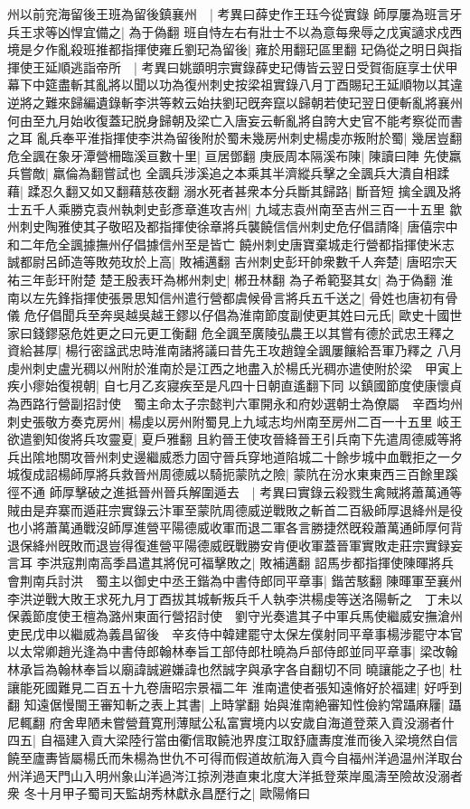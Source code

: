 州以前兖海留後王班為留後鎮襄州　|{
	考異曰薛史作王珏今從實錄}
師厚屢為班言牙兵王求等凶悍宜備之|{
	為于偽翻}
班自恃左右有壯士不以為意每衆辱之戊寅讁求戍西境是夕作亂殺班推都指揮使雍丘劉玘為留後|{
	雍於用翻玘區里翻}
玘偽從之明日與指揮使王延順逃詣帝所　|{
	考異曰姚顗明宗實錄薛史玘傳皆云翌日受賀衙庭享士伏甲幕下中筵盡斬其亂將以聞以功為復州刺史按梁祖實錄八月丁酉賜玘王延順物以其違逆將之難來歸編遺錄斬李洪等敕云始扶劉玘旣奔竄以歸朝若使玘翌日便斬亂將襄州何由至九月始收復蓋玘脱身歸朝及梁亡入唐妄云斬亂將自誇大史官不能考察從而書之耳}
亂兵奉平淮指揮使李洪為留後附於蜀未幾房州刺史楊虔亦叛附於蜀|{
	幾居豈翻}
危全諷在象牙潭營柵臨溪亘數十里|{
	亘居鄧翻}
庚辰周本隔溪布陳|{
	陳讀曰陣}
先使羸兵嘗敵|{
	羸倫為翻嘗試也}
全諷兵涉溪追之本乘其半濟縱兵擊之全諷兵大潰自相蹂藉|{
	蹂忍久翻又如又翻藉慈夜翻}
溺水死者甚衆本分兵斷其歸路|{
	斷音短}
擒全諷及將士五千人乘勝克袁州執刺史彭彥章進攻吉州|{
	九域志袁州南至吉州三百一十五里}
歙州刺史陶雅使其子敬昭及都指揮使徐章將兵襲饒信信州刺史危仔倡請降|{
	唐僖宗中和二年危全諷據撫州仔倡據信州至是皆亡}
饒州刺史唐寶棄城走行營都指揮使米志誠都尉呂師造等敗苑玫於上高|{
	敗補邁翻}
吉州刺史彭玕帥衆數千人奔楚|{
	唐昭宗天祐三年彭玕附楚}
楚王殷表玕為郴州刺史|{
	郴丑林翻}
為子希範娶其女|{
	為于偽翻}
淮南以左先鋒指揮使張景思知信州遣行營都虞候骨言將兵五千送之|{
	骨姓也唐初有骨儀}
危仔倡聞兵至奔吳越吳越王鏐以仔倡為淮南節度副使更其姓曰元氏|{
	歐史十國世家曰錢鏐惡危姓更之曰元更工衡翻}
危全諷至廣陵弘農王以其嘗有德於武忠王釋之資給甚厚|{
	楊行密諡武忠時淮南諸將議曰昔先王攻趙鍠全諷屢饟給吾軍乃釋之}
八月虔州刺史盧光稠以州附於淮南於是江西之地盡入於楊氏光稠亦遣使附於梁　甲寅上疾小瘳始復視朝|{
	自七月乙亥寢疾至是凡四十日朝直遙翻下同}
以鎮國節度使康懷貞為西路行營副招討使　蜀主命太子宗懿判六軍開永和府妙選朝士為僚屬　辛酉均州刺史張敬方奏克房州|{
	楊虔以房州附蜀見上九域志均州南至房州二百一十五里}
岐王欲遣劉知俊將兵攻靈夏|{
	夏戶雅翻}
且約晉王使攻晉絳晉王引兵南下先遣周德威等將兵出隂地關攻晉州刺史邊繼威悉力固守晉兵穿地道陷城二十餘步城中血戰拒之一夕城復成詔楊師厚將兵救晉州周德威以騎扼蒙阬之險|{
	蒙阬在汾水東東西三百餘里蹊徑不通}
師厚擊破之進抵晉州晉兵解圍遁去　|{
	考異曰實錄云殺戮生禽賊將蕭萬通等賊由是弃寨而遁莊宗實錄云汴軍至蒙阬周德威逆戰敗之斬首二百級師厚退絳州是役也小將蕭萬通戰沒師厚進營平陽德威收軍而退二軍各言勝捷然旣殺蕭萬通師厚何背退保絳州旣敗而退豈得復進營平陽德威旣戰勝安肯便收軍蓋晉軍實敗走莊宗實録妄言耳}
李洪寇荆南高季昌遣其將倪可福擊敗之|{
	敗補邁翻}
詔馬步都指揮使陳暉將兵會荆南兵討洪　蜀主以御史中丞王鍇為中書侍郎同平章事|{
	鍇苦駭翻}
陳暉軍至襄州李洪逆戰大敗王求死九月丁酉拔其城斬叛兵千人執李洪楊虔等送洛陽斬之　丁未以保義節度使王檀為潞州東面行營招討使　劉守光奏遣其子中軍兵馬使繼威安撫滄州吏民戊申以繼威為義昌留後　辛亥侍中韓建罷守太保左僕射同平章事楊涉罷守本官以太常卿趙光逢為中書侍郎翰林奉旨工部侍郎杜曉為戶部侍郎並同平章事|{
	梁改翰林承旨為翰林奉旨以廟諱誠避嫌諱也然誠字與承字各自翻切不同}
曉讓能之子也|{
	杜讓能死國難見二百五十九卷唐昭宗景福二年}
淮南遣使者張知遠脩好於福建|{
	好呼到翻}
知遠倨慢閩王審知斬之表上其書|{
	上時掌翻}
始與淮南絶審知性儉約常躡麻屨|{
	躡尼輒翻}
府舍卑陋未嘗營葺寛刑薄賦公私富實境内以安歲自海道登萊入貢没溺者什四五|{
	自福建入貢大梁陸行當由衢信取饒池界度江取舒廬夀度淮而後入梁境然自信饒至廬夀皆屬楊氏而朱楊為世仇不可得而假道故航海入貢今自福州洋過温州洋取台州洋過天門山入明州象山洋過涔江掠洌港直東北度大洋抵登萊岸風濤至險故没溺者衆}
冬十月甲子蜀司天監胡秀林獻永昌歷行之|{
	歐陽脩曰}


